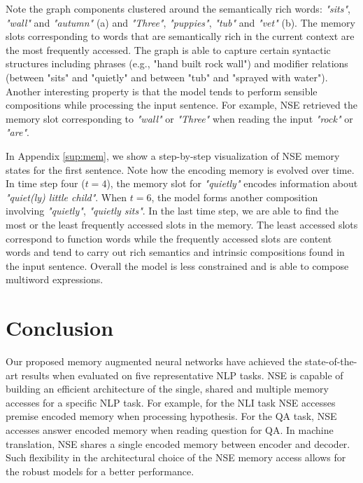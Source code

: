 \documentclass{article}
\begin{document}
Note the graph components clustered around the semantically rich words: \textit{"sits"}, \textit{"wall"} and \textit{"autumn"} (a) and \textit{"Three"}, \textit{"puppies"}, \textit{"tub"} and \textit{"vet"} (b). The memory slots corresponding to words that are semantically rich in the current context are the most frequently accessed. The graph is able to capture certain syntactic structures including phrases (e.g., "hand built rock wall") and modifier relations (between "sits" and "quietly" and between "tub" and "sprayed with water"). Another interesting property is that the model tends to perform sensible compositions while processing the input sentence. For example, NSE retrieved the memory slot corresponding to \textit{"wall"} or \textit{"Three"} when reading the input \textit{"rock"} or \textit{"are"}.

In Appendix \ref{sup:mem}, we show a step-by-step visualization of NSE memory states for the first sentence. Note how the encoding memory is evolved over time. In time step four ($t=4$), the memory slot for \textit{"quietly"} encodes information about \textit{"quiet(ly) little child"}. When $t=6$, the model forms another composition involving \textit{"quietly"}, \textit{"quietly sits"}. In the last time step, we are able to find the most or the least frequently accessed slots in the memory. The least accessed slots correspond to function words while the frequently accessed slots are content words and tend to carry out rich semantics and intrinsic compositions found in the input sentence. Overall the model is less constrained and is able to compose multiword expressions. 

\section{Conclusion}

Our proposed memory augmented neural networks have achieved the state-of-the-art results when evaluated on five representative NLP tasks. 
NSE is capable of building an efficient architecture of the single, shared and multiple memory accesses for a specific NLP task. 
For example, for the NLI task NSE accesses premise encoded memory when processing hypothesis. For the QA task, NSE accesses answer encoded memory when reading question for QA. In machine translation, NSE shares a single encoded memory between encoder and decoder. Such flexibility in the architectural choice of the NSE memory access allows for the robust models for a better performance. 
\end{document}
